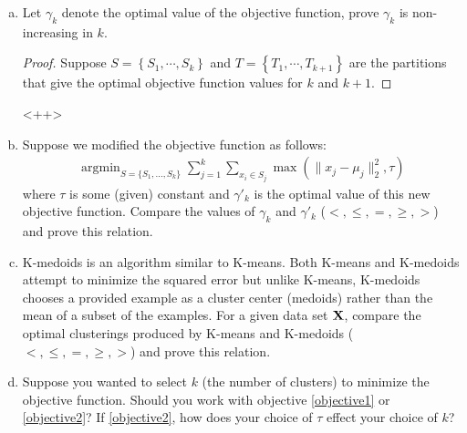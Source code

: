 \documentclass{article}
\newcommand{\X}{{\bf X}}
\begin{document}
	\begin{enumerate}[(a)]
		\item Let $\gamma_k$ denote the optimal value of the objective function, prove $\gamma_k$ is non-increasing in $k$.
			\begin{proof}
				Suppose $S=\left\{ S_1, \cdots, S_k \right\}$ and $T = \left\{ T_1, \cdots, T_{k+1} \right\}$ are the partitions that give the optimal objective function values for $k$ and $k+1.$
			\end{proof}<++>
		\item Suppose we modified the objective function as follows:
			\begin{eqnarray}
				\mathop{\textrm{argmin}}_{S=\{S_1,...,S_k\}}\sum_{j=1}^k\sum_{x_i\in S_j}\max(\|x_j-\mu_j\|_2^2, \tau)
				\label{objective2}
			\end{eqnarray}
			where $\tau$ is some (given) constant and $\gamma'_k$ is the optimal value of this new objective function. Compare the values of 
			$\gamma_k$ and $\gamma'_k$ ($<, \le, =, \ge, >$) and prove this relation.
		\item K-medoids is an algorithm similar to K-means. Both K-means and K-medoids attempt to minimize the squared error but unlike K-means, K-medoids chooses a provided example as a cluster center (medoids) rather than the mean of a subset of the examples. For a given data set $\X$, compare the optimal clusterings produced by K-means and K-medoids ($<, \le, =, \ge, >$) and prove this relation.
		\item Suppose you wanted to select $k$ (the number of clusters) to minimize the objective function. Should you work with objective \ref{objective1} or \ref{objective2}? If \ref{objective2}, how does your choice of $\tau$ effect your choice of $k$?
	\end{enumerate}


	
\end{document}
